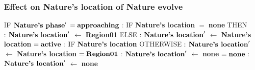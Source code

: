 \documentclass{article}%
\begin{document}
\subsubsection{Effect on Nature's location of Nature evolve}%
\label{ssubsec:Effect on Nature's location of Nature evolve}%
\begin{flushleft}%
IF %
$\mbox{\textbf{Nature's phase}} '$%
\linebreak%
\hspace*{2em}%
$= \mbox{\textbf{approaching}}$%
: %
IF %
\textbf{Nature's location}%
$=$%
\textbf{none}%
\linebreak%
\hspace*{4em}%
THEN %
: %
$\mbox{\textbf{Nature's location}} '$%
$\leftarrow$%
\textbf{Region01}%
\linebreak%
\hspace*{4em}%
ELSE %
: %
$\mbox{\textbf{Nature's location}} '$%
$\leftarrow$%
\textbf{Nature's location}%
\linebreak%
\hspace*{2em}%
$= \mbox{\textbf{active}}$%
: %
IF %
\textbf{Nature's location}%
\linebreak%
\hspace*{4em}%
OTHERWISE %
: %
$\mbox{\textbf{Nature's location}} '$%
$\leftarrow$%
\textbf{Nature's location}%
\linebreak%
\hspace*{4em}%
$= \mbox{\textbf{Region01}}$%
: %
$\mbox{\textbf{Nature's location}} '$%
$\leftarrow$%
\textbf{none}%
\linebreak%
\hspace*{2em}%
$= \mbox{\textbf{none}}$%
: %
$\mbox{\textbf{Nature's location}} '$%
$\leftarrow$%
\textbf{none}%
\end{flushleft}

%
\end{document}
